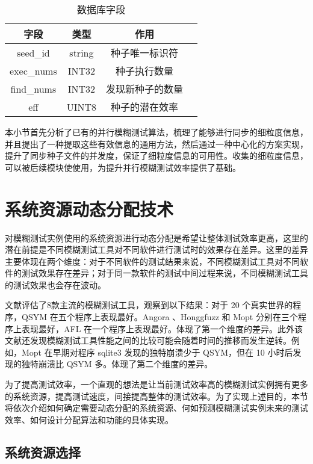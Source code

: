 \documentclass[master]{thesis-uestc}
\begin{document}
\begin{table}[!htbp]
    \caption{数据库字段}
    \begin{tabular}{cccc}
    \toprule
    字段 & 类型 & 作用 \\
    \midrule
    seed\_id & string & 种子唯一标识符 \\
    exec\_nums & INT32 & 种子执行数量 \\
    find\_nums & INT32 & 发现新种子的数量 \\
    eff & UINT8 & 种子的潜在效率 \\
    \bottomrule
    \end{tabular}
    \label{table_database}
    \vspace{6pt}
\end{table}

本小节首先分析了已有的并行模糊测试算法，梳理了能够进行同步的细粒度信息，并且提出了一种提取这些有效信息的通用方法，然后通过一种中心化的方案实现，提升了同步种子文件的并发度，保证了细粒度信息的可用性。收集的细粒度信息，可以被后续模块使使用，为提升并行模糊测试效率提供了基础。

\section{系统资源动态分配技术}

对模糊测试实例使用的系统资源进行动态分配是希望让整体测试效率更高，这里的潜在前提是不同模糊测试工具对不同软件进行测试时的效果存在差异。这里的差异主要体现在两个维度：对于不同软件的测试结果来说，不同模糊测试工具对不同软件的测试效果存在差异；对于同一款软件的测试中间过程来说，不同模糊测试工具的测试效果也会存在波动。

文献\cite{li2021unifuzz}评估了8款主流的模糊测试工具，观察到以下结果：对于 20 个真实世界的程序，QSYM 在五个程序上表现最好。Angora 、Honggfuzz 和 Mopt 分别在三个程序上表现最好，AFL 在一个程序上表现最好。体现了第一个维度的差异。此外该文献还发现模糊测试工具性能之间的比较可能会随着时间的推移而发生逆转。例如，Mopt 在早期对程序 sqlite3 发现的独特崩溃少于 QSYM，但在 10 小时后发现的独特崩溃比 QSYM 多。体现了第二个维度的差异。

为了提高测试效率，一个直观的想法是让当前测试效率高的模糊测试实例拥有更多的系统资源，提高测试速度，间接提高整体的测试效率。为了实现上述目的，本节将依次介绍如何确定需要动态分配的系统资源、何如预测模糊测试实例未来的测试效率、如何设计分配算法和功能的具体实现。

\subsection{系统资源选择}
\end{document}
